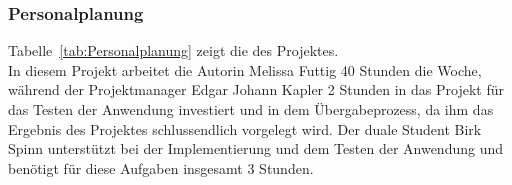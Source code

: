 \subsubsection{Personalplanung}
\label{sec:Personalplanung}
Tabelle~\ref{tab:Personalplanung} zeigt die  des Projektes.
\\
In diesem Projekt arbeitet die Autorin Melissa Futtig 40 Stunden die Woche, während der Projektmanager 
Edgar Johann Kapler 2 Stunden in das Projekt für das Testen der Anwendung investiert und in dem 
Übergabeprozess, da ihm das Ergebnis des Projektes schlussendlich vorgelegt wird. Der duale Student 
Birk Spinn unterstützt bei der Implementierung und dem Testen der Anwendung und benötigt für diese 
Aufgaben insgesamt 3 Stunden.

